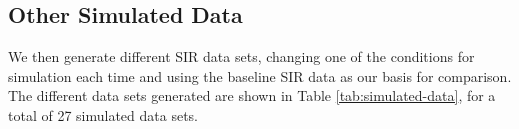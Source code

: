 \documentclass[12pt]{article}
\begin{document}
      \subsection{Other Simulated Data}

We then generate different SIR data sets, changing one of the conditions for simulation each time and using the baseline SIR data as our basis for comparison. The different data sets generated are shown in Table \ref{tab:simulated-data}, for a total of 27 simulated data sets.


\end{document}
